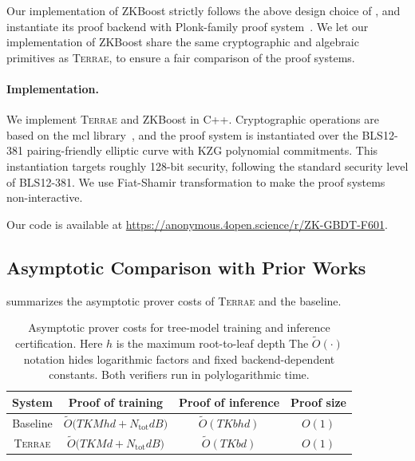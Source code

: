 Our implementation of ZKBoost strictly follows the above design choice of \cite{zkboost26},
    and instantiate its proof backend with Plonk-family proof system~\cite{plonk19, plookup20}.
    We let our implementation of ZKBoost
    share the same cryptographic and 
    algebraic primitives as \textsc{Terrae},
    to ensure a fair comparison of the proof systems.

\paragraph{Implementation.} 
We implement \textsc{Terrae} and ZKBoost in C++.
  Cryptographic 
  operations are based on the mcl library~\cite{mcllib}, and the proof system is instantiated over the BLS12-381 pairing-friendly elliptic curve 
  with KZG polynomial commitments. This  
  instantiation targets roughly 128-bit security, following the standard security level of BLS12-381.
  We use Fiat-Shamir transformation to make 
  the proof systems non-interactive.

Our code is available at \url{https://anonymous.4open.science/r/ZK-GBDT-F601}.


\subsection{Asymptotic Comparison with Prior Works}

 summarizes the asymptotic prover costs of
\textsc{Terrae} and the baseline. 

\begin{table}[t]
    \centering
    \small
    \caption{Asymptotic prover costs for tree-model training and inference
    certification. Here $h$ is the maximum root-to-leaf depth
    The
    $\tilde{O}(\cdot)$ notation hides logarithmic factors and fixed
    backend-dependent constants.
    Both verifiers run in polylogarithmic time.}
    \label{tab:complexity-comparison}
    \begin{tabular}{cccc}
        \toprule
        System & Proof of training & Proof of inference & Proof size\\
        \midrule
        Baseline
        & $\tilde{O}\bigl(TKMhd+N_{\mathrm{tot}}dB\bigr)$
        & $\tilde{O}(TKbhd)$
        & $O(1)$ \\
        \textsc{Terrae}
        & $\tilde{O}\bigl(TKMd+N_{\mathrm{tot}}dB\bigr)$
        & $\tilde{O}(TKbd)$
        & $O(1)$ \\
        \bottomrule
    \end{tabular}
\end{table}

